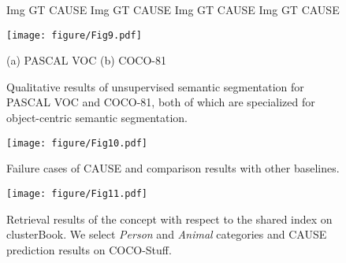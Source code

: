 \documentclass{article} \usepackage{iclr2024_conference,times}
\begin{document}
\begin{figure*}[t]
\centering
\begin{flushleft}
    \hspace{0.3cm} Img \hspace{0.45cm} GT \hspace{0.15cm} CAUSE
    \hspace{0.1cm} Img \hspace{0.45cm} GT \hspace{0.15cm} CAUSE
    \hspace{0.27cm} Img \hspace{0.45cm} GT \hspace{0.15cm} CAUSE
    \hspace{0.1cm} Img \hspace{0.45cm} GT \hspace{0.15cm} CAUSE
\end{flushleft}		
\vspace*{-0.2cm}
\texttt{[image: figure/Fig9.pdf]}
\begin{flushleft}
    \hspace{2.1cm} (a) PASCAL VOC \hspace{4.5cm} (b) COCO-81
\end{flushleft}
\vspace*{-0.2cm}
\caption{Qualitative results of unsupervised semantic segmentation for PASCAL VOC and COCO-81, both of which are specialized for object-centric semantic segmentation.} 
\label{fig:pascal_coco}
\end{figure*}



\begin{figure*}[t]
\centering
\texttt{[image: figure/Fig10.pdf]}
\caption{Failure cases of CAUSE and comparison results with other baselines.} 
\label{fig:fail}

\end{figure*}


\begin{figure*}[t]
\centering
\texttt{[image: figure/Fig11.pdf]}
\caption{Retrieval results of the concept with respect to the shared index on clusterBook. We select \textit{Person} and \textit{Animal} categories and CAUSE prediction results on COCO-Stuff.} 
\label{fig:concept}
\end{figure*}
\end{document}
